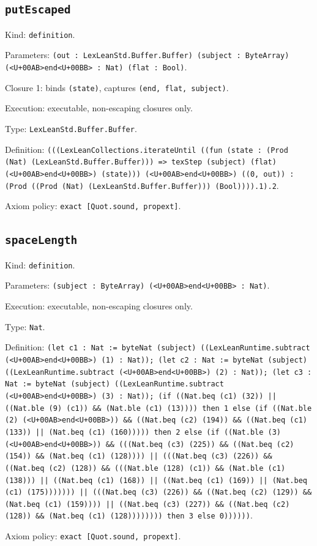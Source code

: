 \documentclass[11pt]{article}
\begin{document}
\subsection*{\texttt{putEscaped}}
\noindent Kind: \texttt{definition}.\par
\noindent Parameters: \texttt{(out : LexLeanStd.Buffer.Buffer) (subject : ByteArray) (<U+00AB>end<U+00BB> : Nat) (flat : Bool)}.\par
\noindent Closure 1: binds \texttt{(state)}, captures \texttt{(end, flat, subject)}.\par
\noindent Execution: executable, non-escaping closures only.\par
\noindent Type: \texttt{LexLeanStd.Buffer.Buffer}.\par
\noindent Definition: \texttt{(((LexLeanCollections.iterateUntil ((fun (state : (Prod (Nat) (LexLeanStd.Buffer.Buffer))) => texStep (subject) (flat) (<U+00AB>end<U+00BB>) (state))) (<U+00AB>end<U+00BB>) ((0, out)) : (Prod ((Prod (Nat) (LexLeanStd.Buffer.Buffer))) (Bool)))).1).2}.\par
\noindent Axiom policy: \texttt{exact [Quot.sound, propext]}.\par
\subsection*{\texttt{spaceLength}}
\noindent Kind: \texttt{definition}.\par
\noindent Parameters: \texttt{(subject : ByteArray) (<U+00AB>end<U+00BB> : Nat)}.\par
\noindent Execution: executable, non-escaping closures only.\par
\noindent Type: \texttt{Nat}.\par
\noindent Definition: \texttt{(let c1 : Nat := byteNat (subject) ((LexLeanRuntime.subtract (<U+00AB>end<U+00BB>) (1) : Nat)); (let c2 : Nat := byteNat (subject) ((LexLeanRuntime.subtract (<U+00AB>end<U+00BB>) (2) : Nat)); (let c3 : Nat := byteNat (subject) ((LexLeanRuntime.subtract (<U+00AB>end<U+00BB>) (3) : Nat)); (if ((Nat.beq (c1) (32)) || ((Nat.ble (9) (c1)) \&\& (Nat.ble (c1) (13)))) then 1 else (if ((Nat.ble (2) (<U+00AB>end<U+00BB>)) \&\& ((Nat.beq (c2) (194)) \&\& ((Nat.beq (c1) (133)) || (Nat.beq (c1) (160))))) then 2 else (if ((Nat.ble (3) (<U+00AB>end<U+00BB>)) \&\& (((Nat.beq (c3) (225)) \&\& ((Nat.beq (c2) (154)) \&\& (Nat.beq (c1) (128)))) || (((Nat.beq (c3) (226)) \&\& ((Nat.beq (c2) (128)) \&\& (((Nat.ble (128) (c1)) \&\& (Nat.ble (c1) (138))) || ((Nat.beq (c1) (168)) || ((Nat.beq (c1) (169)) || (Nat.beq (c1) (175))))))) || (((Nat.beq (c3) (226)) \&\& ((Nat.beq (c2) (129)) \&\& (Nat.beq (c1) (159)))) || ((Nat.beq (c3) (227)) \&\& ((Nat.beq (c2) (128)) \&\& (Nat.beq (c1) (128)))))))) then 3 else 0))))))}.\par
\noindent Axiom policy: \texttt{exact [Quot.sound, propext]}.\par
\end{document}
